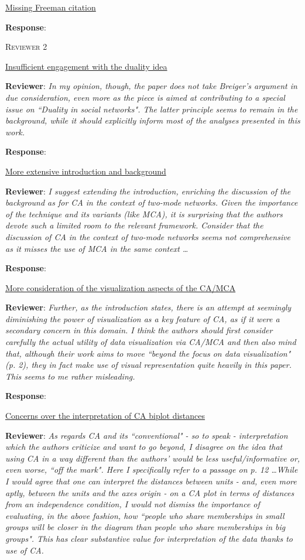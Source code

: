 \documentclass{article}
\begin{document}
\underline{Missing Freeman citation}

\textbf{Response}:

\newpage
\textsc{Reviewer 2}

\underline{Insufficient engagement with the duality idea}

\textbf{Reviewer}: \textit{In my opinion, though, the paper does not take Breiger's argument in due consideration, even more as the piece is aimed at contributing to a special issue on ``Duality in social networks". The latter principle seems to remain in the background, while it should explicitly inform most of the analyses presented in this work.}

\textbf{Response}:

\underline{More extensive introduction and background}

\textbf{Reviewer}: \textit{I suggest extending the introduction, enriching the discussion of the background as for CA in the context of two-mode networks. Given the importance of the technique and its variants (like MCA), it is surprising that the authors devote such a limited room to the relevant framework. Consider that the discussion of CA in the context of two-mode networks seems not comprehensive as it misses the use of MCA in the same context \ldots}

\textbf{Response}:

\underline{More consideration of the visualization aspects of the CA/MCA}

\textbf{Reviewer}: \textit{Further, as the introduction states, there is an attempt at seemingly diminishing the power of visualization as a key feature of CA, as if it were a secondary concern in this domain. I think the authors should first consider carefully the actual utility of data visualization via CA/MCA and then also mind that, although their work aims to move ``beyond the focus on data visualization" (p. 2), they in fact make use of visual representation quite heavily in this paper. This seems to me rather misleading.} 

\textbf{Response}:

\underline{Concerns over the interpretation of CA biplot distances}

\textbf{Reviewer}: \textit{As regards CA and its ``conventional" - so to speak - interpretation which the authors criticize and want to go beyond, I disagree on the idea that using CA in a way different than the authors' would be less useful/informative or, even worse, ``off the mark". Here I specifically refer to a passage on p. 12 \ldots While I would agree that one can interpret the distances between units - and, even more aptly, between the units and the axes origin - on a CA plot in terms of distances from an independence condition, I would not dismiss the importance of evaluating, in the above fashion, how ``people who share memberships in small groups will be closer in the diagram than people who share memberships in big groups". This has clear substantive value for interpretation of the data thanks to use of CA.}
\end{document}
